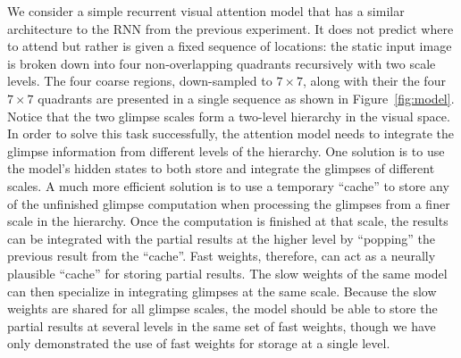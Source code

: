 \documentclass{article}
\begin{document}
We consider a simple recurrent visual attention model that has 
a similar architecture to the RNN from the previous experiment. It does not predict where to attend but rather is given a fixed sequence of locations: the static input image is broken down into four non-overlapping quadrants recursively with two scale levels. The four coarse regions, down-sampled to $7\times 7$,  along with their the four $7\times 7$ quadrants are presented in a single sequence as shown in Figure~\ref{fig:model}. Notice that the two glimpse scales form a two-level hierarchy in the visual space.  In order to solve this task successfully, the attention model needs to integrate the glimpse information from different levels of the hierarchy. One solution is to use the model's hidden states to both store and integrate the glimpses of different scales. A much more efficient solution is to use a temporary ``cache'' to store any of the unfinished glimpse computation when processing the glimpses from a finer scale in the hierarchy. Once the computation is finished at that scale, the results can be integrated with the partial results at the higher level by ``popping'' the previous result from the ``cache''. Fast weights, therefore, can act as a neurally plausible ``cache'' for storing partial results. The slow weights of the same model can then specialize in integrating glimpses at the same scale. Because the slow weights are shared for all glimpse scales, the model should be able to store the partial results at several levels in the same set of fast weights, though we have only demonstrated the use of fast weights for storage at a single level. 
\end{document}
